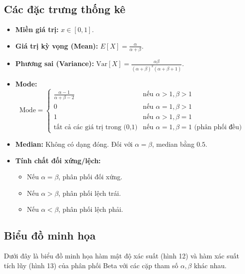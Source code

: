	\subsection{Các đặc trưng thống kê}
	\begin{itemize}
		\item \textbf{Miền giá trị:} $x \in [0, 1]$.
		\item \textbf{Giá trị kỳ vọng (Mean):} $E[X] = \frac{\alpha}{\alpha+\beta}$.
		\item \textbf{Phương sai (Variance):} $\text{Var}[X] = \frac{\alpha\beta}{(\alpha+\beta)^2(\alpha+\beta+1)}$.
		\item \textbf{Mode:}
		\[ \text{Mode} = \begin{cases} \frac{\alpha-1}{\alpha+\beta-2} & \text{nếu } \alpha > 1, \beta > 1 \\ 0 & \text{nếu } \alpha=1, \beta > 1 \\ 1 & \text{nếu } \alpha > 1, \beta=1 \\ \text{tất cả các giá trị trong (0,1)} & \text{nếu } \alpha=1, \beta=1 \text{ (phân phối đều)} \end{cases} \]
		\item \textbf{Median:} Không có dạng đóng. Đối với $\alpha = \beta$, median bằng $0.5$.
		\item \textbf{Tính chất đối xứng/lệch:}
		\begin{itemize}
			\item Nếu $\alpha = \beta$, phân phối đối xứng.
			\item Nếu $\alpha > \beta$, phân phối lệch trái.
			\item Nếu $\alpha < \beta$, phân phối lệch phải.
		\end{itemize}
	\end{itemize}
	
	\subsection{Biểu đồ minh họa}
	Dưới đây là biểu đồ minh họa hàm mật độ xác suất (hình 12) và hàm xác suất tích lũy (hình 13)  của phân phối Beta với các cặp tham số $\alpha, \beta$ khác nhau.
	
